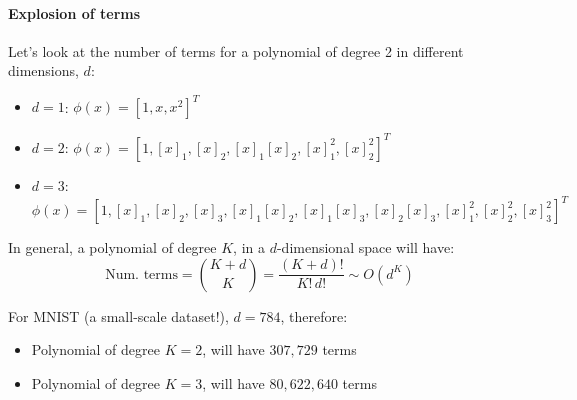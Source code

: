 \documentclass[11pt]{article}
\begin{document}
\paragraph{Explosion of terms}
Let’s look at the number of terms for a polynomial of degree 2 in different dimensions, $d$:
\begin{itemize}
	\item $d = 1$: \quad $\phi(x) = [1, x, x^2]^T$
	\item $d = 2$: \quad $\phi(x) = [1, [x]_1, [x]_2, [x]_1[x]_2, [x]_1^2, [x]_2^2]^T$
	\item $d = 3$: \quad $\phi(x) = [1, [x]_1, [x]_2, [x]_3, [x]_1[x]_2, [x]_1[x]_3, [x]_2[x]_3, [x]_1^2, [x]_2^2, [x]_3^2]^T$
\end{itemize}

\vspace{0.4cm}
In general, a polynomial of degree $K$, in a $d$-dimensional space will have:
\[
	\text{Num. terms} = \binom{K+d}{K} = \frac{(K+d)!}{K! \, d!} \sim O(d^K)
\]

\vspace{0.4cm}
For MNIST (a small-scale dataset!), $d = 784$, therefore:
\begin{itemize}
	\item Polynomial of degree $K=2$, will have $307{,}729$ terms
	\item Polynomial of degree $K=3$, will have $80{,}622{,}640$ terms
\end{itemize}
\end{document}
